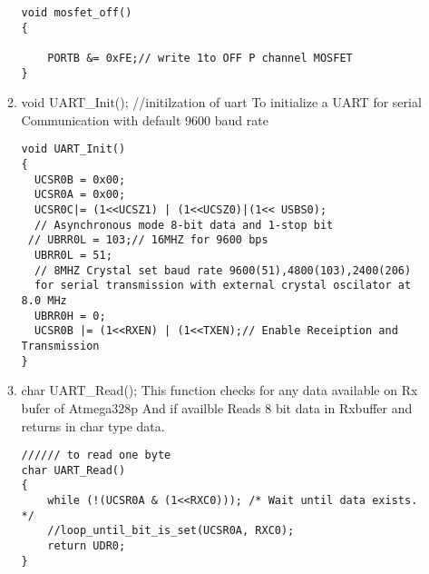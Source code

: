 \documentclass{article}
\begin{document}
\begin{itemize}
\begin{enumerate}
\begin{lstlisting}
void mosfet_off()
{
	
	PORTB &= 0xFE;// write 1to OFF P channel MOSFET
}
\end{lstlisting}
\item void UART\_Init();  //initilzation of uart
\newline  To initialize  a UART for serial Communication with default 9600 baud rate
\begin{lstlisting}
void UART_Init()
{
  UCSR0B = 0x00;
  UCSR0A = 0x00; 
  UCSR0C|= (1<<UCSZ1) | (1<<UCSZ0)|(1<< USBS0);   
  // Asynchronous mode 8-bit data and 1-stop bit 
 // UBRR0L = 103;// 16MHZ for 9600 bps
  UBRR0L = 51; 
  // 8MHZ Crystal set baud rate 9600(51),4800(103),2400(206) 
  for serial transmission with external crystal oscilator at 8.0 MHz 
  UBRR0H = 0;
  UCSR0B |= (1<<RXEN) | (1<<TXEN);// Enable Receiption and Transmission
}
\end{lstlisting}
\item char UART\_Read();
\newline  This function checks for any data available on Rx bufer of Atmega328p
And if availble Reads 8 bit data in Rxbuffer and returns in char type data.
\begin{lstlisting}
////// to read one byte
char UART_Read()
{
	while (!(UCSR0A & (1<<RXC0))); /* Wait until data exists. */
	//loop_until_bit_is_set(UCSR0A, RXC0);
	return UDR0;
}


\end{lstlisting}
\end{enumerate}
\end{itemize}
\end{document}
